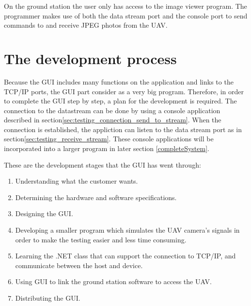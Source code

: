 
\label{chap:implementation_ground_station }

On the ground station the user only has access to the image viewer program.
The programmer makes use of both the data stream port and the console port to send commands to and receive JPEG photos from the UAV.

\section{The development process} 
Because the GUI includes many functions on the application and links to the TCP/IP ports, the GUI part consider as a very big program. 
Therefore, in order to complete the GUI step by step, a plan for the development is required.
The connection to the datastream can be done by using a console application described in section\ref{sec:testing_connection_send_to_stream}.
When the connection is established, the appliction can listen to the data stream port as in section\ref{sec:testing_receive_stream}.
These console applications will be incorporated into a larger program in later section \ref{completeSystem}. 

These are the development stages that the GUI has went through:

\flushleft
\begin{enumerate}

\item	Understanding what the customer wants. 

\item	Determining the hardware and software specifications.
 
\item	Designing the GUI.

\item  Developing a smaller program which simulates the UAV camera's signals in order to make the testing easier and less time consuming. 

\item	Learning the .NET class that can support the connection to TCP/IP, and communicate between the host and device.

\item	Using GUI to link the ground station software to access the UAV.

\item	Distributing the GUI.
\end{enumerate}

